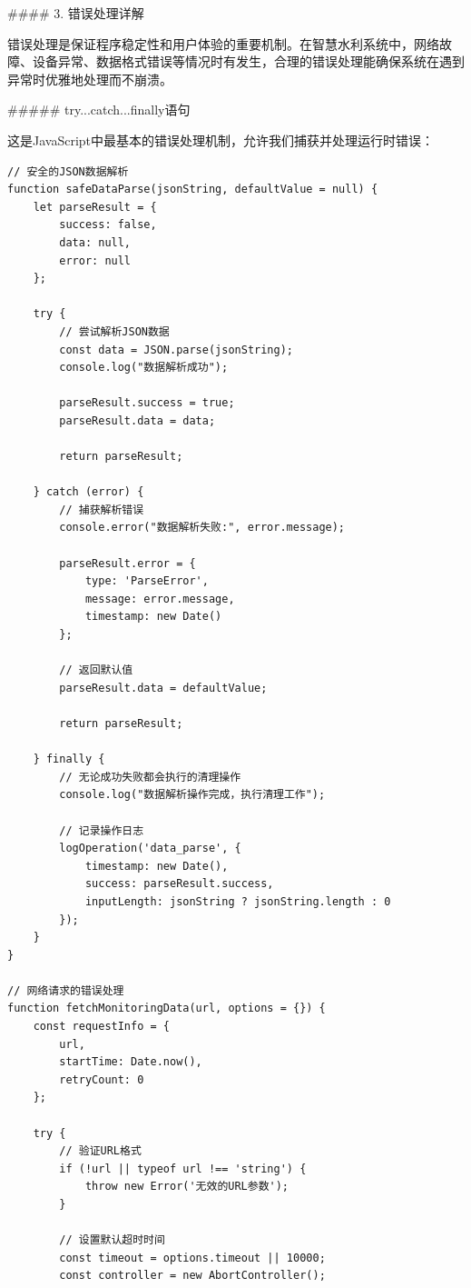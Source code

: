 {#### 3. 错误处理详解

错误处理是保证程序稳定性和用户体验的重要机制。在智慧水利系统中，网络故障、设备异常、数据格式错误等情况时有发生，合理的错误处理能确保系统在遇到异常时优雅地处理而不崩溃。

##### try...catch...finally语句

这是JavaScript中最基本的错误处理机制，允许我们捕获并处理运行时错误：

\begin{lstlisting}[style=javascript]
// 安全的JSON数据解析
function safeDataParse(jsonString, defaultValue = null) {
    let parseResult = {
        success: false,
        data: null,
        error: null
    };
    
    try {
        // 尝试解析JSON数据
        const data = JSON.parse(jsonString);
        console.log("数据解析成功");
        
        parseResult.success = true;
        parseResult.data = data;
        
        return parseResult;
        
    } catch (error) {
        // 捕获解析错误
        console.error("数据解析失败:", error.message);
        
        parseResult.error = {
            type: 'ParseError',
            message: error.message,
            timestamp: new Date()
        };
        
        // 返回默认值
        parseResult.data = defaultValue;
        
        return parseResult;
        
    } finally {
        // 无论成功失败都会执行的清理操作
        console.log("数据解析操作完成，执行清理工作");
        
        // 记录操作日志
        logOperation('data_parse', {
            timestamp: new Date(),
            success: parseResult.success,
            inputLength: jsonString ? jsonString.length : 0
        });
    }
}

// 网络请求的错误处理
function fetchMonitoringData(url, options = {}) {
    const requestInfo = {
        url,
        startTime: Date.now(),
        retryCount: 0
    };
    
    try {
        // 验证URL格式
        if (!url || typeof url !== 'string') {
            throw new Error('无效的URL参数');
        }
        
        // 设置默认超时时间
        const timeout = options.timeout || 10000;
        const controller = new AbortController();
        

\end{lstlisting}}

